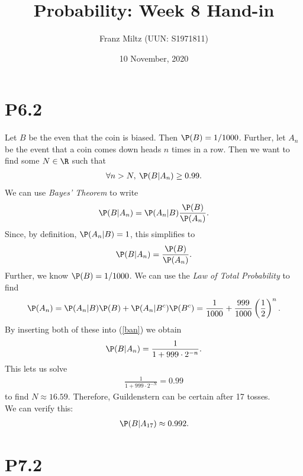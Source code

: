\documentclass{article}
\begin{document}
\title{Probability: Week 8 Hand-in}
\author{Franz Miltz (UUN: S1971811)}
\date{10 November, 2020}
\maketitle


\section*{P6.2}


Let $B$ be the even that the coin is biased. Then $\P(B)=1/1000$. Further,
let $A_n$ be the event that a coin comes down heads $n$ times in a row.
Then we want to find some $N\in\R$ such that
\begin{align*}
	\forall n > N,\: \P(B|A_n)\geq 0.99.
\end{align*}
We can use \emph{Bayes' Theorem} to write
\begin{align*}
	\P(B|A_n) = \P(A_n|B)\frac{\P(B)}{\P(A_n)}.
\end{align*}
Since, by definition, $\P(A_n|B)=1$, this simplifies to
\begin{align}
	\label{ban}
	\P(B|A_n) = \frac{\P(B)}{\P(A_n)}.
\end{align}
Further, we know $\P(B)=1/1000$. We can use the \emph{Law of Total
	Probability} to find
\begin{align*}
	\P(A_n)=\P(A_n|B)\P(B) + \P(A_n|B^c)\P(B^c)
	=\frac{1}{1000}+\frac{999}{1000}\left(\frac{1}{2}\right)^n.
\end{align*}
By inserting both of these into (\ref{ban}) we obtain
\begin{align*}
	\P(B|A_n) = \frac{1}{1+999\cdot 2^{-n}}.
\end{align*}
This lets us solve
\begin{align*}
	\frac{1}{1+999\cdot 2^{-N}} = 0.99
\end{align*}
to find $N\approx 16.59$. Therefore, Guildenstern can be certain after
17 tosses.\\
We can verify this:
\begin{align*}
	\P(B|A_{17}) \approx 0.992.
\end{align*}


\section*{P7.2}
\end{document}
